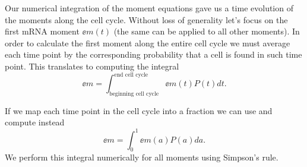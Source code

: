 Our numerical integration of the moment equations gave us a time evolution of
the moments along the cell cycle. Without loss of generality let's focus on the
first mRNA moment $\ee{m(t)}$ (the same can be applied to all other moments).
In order to calculate the first moment along the entire cell cycle we must
average each time point by the corresponding probability that a cell is found
in such time point. This translates to computing the integral
\begin{equation}
  \ee{m} = \int_{\text{beginning cell cycle}}^{\text{end cell cycle}}
                       \ee{m(t)} P(t) dt.
\end{equation}

If we map each time point in the cell cycle into a fraction we can use
 and compute instead
\begin{equation}
  \ee{m} = \int_0^1 \ee{m(a)} P(a) da.
  \label{eq_moment_avg}
\end{equation}
We perform this integral numerically for all moments using Simpson's rule.
